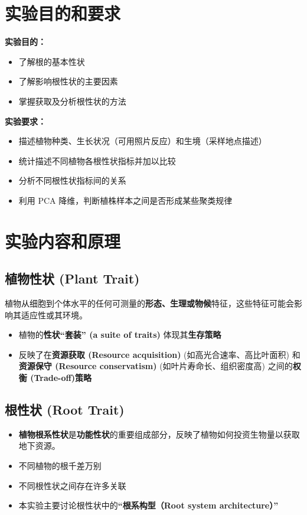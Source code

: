\documentclass[10.5pt]{config}
\date{2025.10.22}
\begin{document}
\makeheader %


\section{实验目的和要求}
\textbf{实验目的：}

\begin{itemize}
\item 了解根的基本性状
\item 了解影响根性状的主要因素
\item 掌握获取及分析根性状的方法
\end{itemize}

\textbf{实验要求：}

\begin{itemize}
\item 描述植物种类、生长状况（可用照片反应）和生境（采样地点描述）
\item 统计描述不同植物各根性状指标并加以比较
\item 分析不同根性状指标间的关系
\item 利用 PCA 降维，判断植株样本之间是否形成某些聚类规律
\end{itemize}

\section{实验内容和原理}
\subsection{植物性状 (Plant Trait)}
植物从细胞到个体水平的任何可测量的\textbf{形态、生理或物候}特征，这些特征可能会影响其适应性或其环境。

\begin{itemize}
    \item 植物的\textbf{性状“套装” (a suite of traits)} 体现其\textbf{生存策略}
    \item 反映了在\textbf{资源获取 (Resource acquisition)} (如高光合速率、高比叶面积) 和\textbf{资源保守 (Resource conservatism)} (如叶片寿命长、组织密度高) 之间的\textbf{权衡 (Trade-off)策略}
\end{itemize}

\subsection{根性状 (Root Trait)}
\begin{itemize}
    \item \textbf{植物根系性状}是\textbf{功能性状}的重要组成部分，反映了植物如何投资生物量以获取地下资源。
    \item 不同植物的根千差万别
    \item 不同根性状之间存在许多关联
    \item 本实验主要讨论根性状中的\textbf{“根系构型（Root system architecture）”}
\end{itemize}
\end{document}
